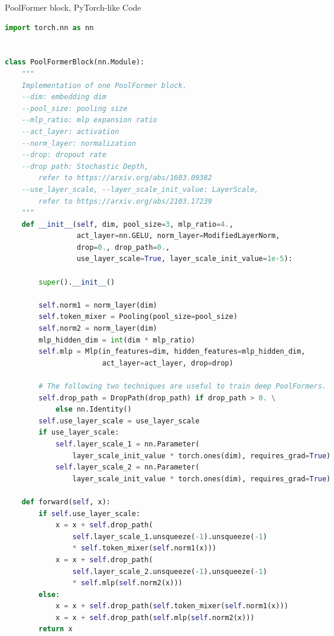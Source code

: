 \begin{algorithm*}[t]
\caption{PoolFormer block, PyTorch-like Code}
\label{alg:block}
\begin{lstlisting}[language=python]
import torch.nn as nn


class PoolFormerBlock(nn.Module):
    """
    Implementation of one PoolFormer block.
    --dim: embedding dim
    --pool_size: pooling size
    --mlp_ratio: mlp expansion ratio
    --act_layer: activation
    --norm_layer: normalization
    --drop: dropout rate
    --drop path: Stochastic Depth, 
        refer to https://arxiv.org/abs/1603.09382
    --use_layer_scale, --layer_scale_init_value: LayerScale, 
        refer to https://arxiv.org/abs/2103.17239
    """
    def __init__(self, dim, pool_size=3, mlp_ratio=4., 
                 act_layer=nn.GELU, norm_layer=ModifiedLayerNorm, 
                 drop=0., drop_path=0., 
                 use_layer_scale=True, layer_scale_init_value=1e-5):

        super().__init__()

        self.norm1 = norm_layer(dim)
        self.token_mixer = Pooling(pool_size=pool_size)
        self.norm2 = norm_layer(dim)
        mlp_hidden_dim = int(dim * mlp_ratio)
        self.mlp = Mlp(in_features=dim, hidden_features=mlp_hidden_dim, 
                       act_layer=act_layer, drop=drop)

        # The following two techniques are useful to train deep PoolFormers.
        self.drop_path = DropPath(drop_path) if drop_path > 0. \
            else nn.Identity()
        self.use_layer_scale = use_layer_scale
        if use_layer_scale:
            self.layer_scale_1 = nn.Parameter(
                layer_scale_init_value * torch.ones(dim), requires_grad=True)
            self.layer_scale_2 = nn.Parameter(
                layer_scale_init_value * torch.ones(dim), requires_grad=True)

    def forward(self, x):
        if self.use_layer_scale:
            x = x + self.drop_path(
                self.layer_scale_1.unsqueeze(-1).unsqueeze(-1)
                * self.token_mixer(self.norm1(x)))
            x = x + self.drop_path(
                self.layer_scale_2.unsqueeze(-1).unsqueeze(-1)
                * self.mlp(self.norm2(x)))
        else:
            x = x + self.drop_path(self.token_mixer(self.norm1(x)))
            x = x + self.drop_path(self.mlp(self.norm2(x)))
        return x
\end{lstlisting}
\end{algorithm*}
